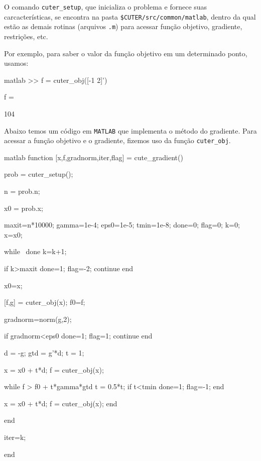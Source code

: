 \documentclass[letterpaper,11pt]{article}
\numberwithin{equation}{section}
\begin{document}
O comando {\tt cuter\_setup}, que inicializa o problema e fornece suas carcacter\'isticas, se 
encontra na pasta {\tt \$CUTER/src/common/matlab}, dentro da qual est\~ao as demais rotinas 
(arquivos {\tt .m}) para acessar fun\c{c}\~ao objetivo, gradiente, restri\c{c}\~oes, etc.

Por exemplo, para saber o valor da fun\c{c}\~ao objetivo em um determinado ponto, usamos:
\begin{code}{matlab}
>> f = cuter_obj([-1 2]')

f =

   104
\end{code}
Abaixo temos um c\'odigo em {\tt MATLAB} que implementa o m\'etodo do gradiente. Para acessar a 
fun\c{c}\~ao objetivo e o gradiente, fizemos uso da fun\c{c}\~ao {\tt cuter\_obj}.
\begin{code}{matlab}
function [x,f,gradnorm,iter,flag] = cute_gradient()
%
%
%

    prob = cuter_setup();
    
    n = prob.n;
    
    x0 = prob.x;
    
    maxit=n*10000;
    gamma=1e-4;
    eps0=1e-5;
    tmin=1e-8;
    done=0;
    flag=0;
    k=0;
    x=x0;
    
    while ~done
        k=k+1;
        
        if k>maxit
           done=1;
           flag=-2;
           continue
        end
        
        x0=x;
        
        [f,g] = cuter_obj(x);
        f0=f;
        
        gradnorm=norm(g,2);
        
        if gradnorm<eps0
            done=1;
            flag=1;
            continue
        end
        
        d = -g;
        gtd = g'*d;
        t = 1;
        
        x = x0 + t*d;
        f = cuter_obj(x);
        
        while f > f0 + t*gamma*gtd
            t = 0.5*t;
            if t<tmin
                done=1;
                flag=-1;
            end
            
            x = x0 + t*d;
            f = cuter_obj(x);
        end
        
    end
    
    iter=k;

end
\end{code}
\end{document}
